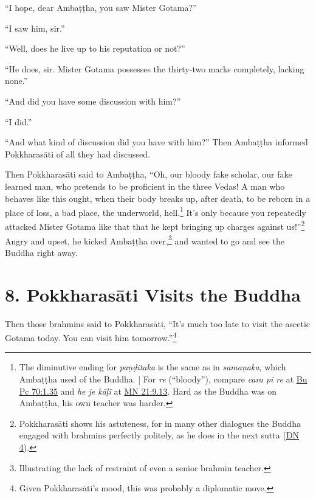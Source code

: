 \documentclass[12pt,openany]{book}%
\begin{document}
“I hope, dear \textsanskrit{Ambaṭṭha}, you saw Mister Gotama?” 

“I saw him, sir.” 

“Well, does he live up to his reputation or not?” 

“He does, sir. Mister Gotama possesses the thirty-two marks completely, lacking none.” 

“And did you have some discussion with him?” 

“I did.” 

“And what kind of discussion did you have with him?” Then \textsanskrit{Ambaṭṭha} informed \textsanskrit{Pokkharasāti} of all they had discussed. 

Then \textsanskrit{Pokkharasāti} said to \textsanskrit{Ambaṭṭha}, “Oh, our bloody fake scholar, our fake learned man, who pretends to be proficient in the three Vedas! A man who behaves like this ought, when their body breaks up, after death, to be reborn in a place of loss, a bad place, the underworld, hell.\footnote{The diminutive ending for \textit{\textsanskrit{paṇḍitaka}} is the same as in \textit{\textsanskrit{samaṇaka}}, which \textsanskrit{Ambaṭṭha} used of the Buddha. | For \textit{re} (“bloody”), compare \textit{cara pi re} at \href{https://suttacentral.net/pli-tv-bu-vb-pc70/en/sujato\#1.35}{Bu Pc 70:1.35} and \textit{he je \textsanskrit{kāḷī}} at \href{https://suttacentral.net/mn21/en/sujato\#9.13}{MN 21:9.13}. Hard as the Buddha was on \textsanskrit{Ambaṭṭha}, his own teacher was harder. } It’s only because you repeatedly attacked Mister Gotama like that that he kept bringing up charges against us!”\footnote{\textsanskrit{Pokkharasāti} shows his astuteness, for in many other dialogues the Buddha engaged with brahmins perfectly politely, as he does in the next sutta (\href{https://suttacentral.net/dn4/en/sujato}{DN 4}). } Angry and upset, he kicked \textsanskrit{Ambaṭṭha} over,\footnote{Illustrating the lack of restraint of even a senior brahmin teacher. } and wanted to go and see the Buddha right away. 

\section*{8. \textsanskrit{Pokkharasāti} Visits the Buddha }

Then those brahmins said to \textsanskrit{Pokkharasāti}, “It’s much too late to visit the ascetic Gotama today. You can visit him tomorrow.”\footnote{Given \textsanskrit{Pokkharasāti}’s mood, this was probably a diplomatic move. } 
\end{document}
